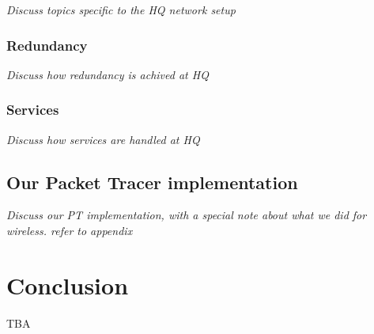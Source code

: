 \textit{Discuss topics specific to the HQ network setup}

\subsubsection{Redundancy}

\textit{Discuss how redundancy is achived at HQ}

\subsubsection{Services}

\textit{Discuss how services are handled at HQ}

\subsection{Our Packet Tracer implementation}

\textit{Discuss our PT implementation, with a special note about what we did for wireless. refer to appendix}

\section{Conclusion}
TBA


\clearpage %

\nocite{*}





\clearpage %
\appendix


